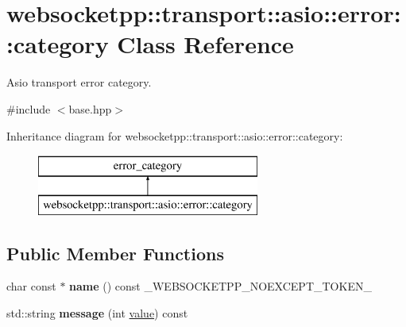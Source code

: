 \hypertarget{classwebsocketpp_1_1transport_1_1asio_1_1error_1_1category}{}\section{websocketpp\+:\+:transport\+:\+:asio\+:\+:error\+:\+:category Class Reference}
\label{classwebsocketpp_1_1transport_1_1asio_1_1error_1_1category}


Asio transport error category.  




{\ttfamily \#include $<$base.\+hpp$>$}

Inheritance diagram for websocketpp\+:\+:transport\+:\+:asio\+:\+:error\+:\+:category\+:\begin{figure}[H]
\begin{center}
\leavevmode
\includegraphics[height=2.000000cm]{classwebsocketpp_1_1transport_1_1asio_1_1error_1_1category}
\end{center}
\end{figure}
\subsection*{Public Member Functions}
\begin{DoxyCompactItemize}
\item 
char const  $\ast$ {\bfseries name} () const \+\_\+\+W\+E\+B\+S\+O\+C\+K\+E\+T\+P\+P\+\_\+\+N\+O\+E\+X\+C\+E\+P\+T\+\_\+\+T\+O\+K\+E\+N\+\_\+\hypertarget{classwebsocketpp_1_1transport_1_1asio_1_1error_1_1category_af661dabfb4baefe6954d785b3b4fea57}{}\label{classwebsocketpp_1_1transport_1_1asio_1_1error_1_1category_af661dabfb4baefe6954d785b3b4fea57}

\item 
std\+::string {\bfseries message} (int \hyperlink{namespacewebsocketpp_1_1transport_1_1asio_1_1error_aeb44b27fc0ffac2a8991bf629cbfd045}{value}) const\hypertarget{classwebsocketpp_1_1transport_1_1asio_1_1error_1_1category_aef49ea23d7e4161c0f4623fa5c2e5045}{}\label{classwebsocketpp_1_1transport_1_1asio_1_1error_1_1category_aef49ea23d7e4161c0f4623fa5c2e5045}

\end{DoxyCompactItemize}


